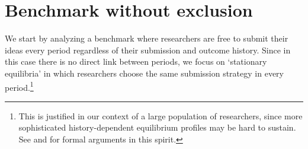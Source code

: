 \documentclass[12pt]{article}
\theoremstyle{plain}
\theoremstyle{definition}
\newtheorem{definition}{Definition}
\theoremstyle{remark}
\begin{document}






\section{Benchmark without exclusion}\label{sec-benchmark}

We start by analyzing a benchmark where researchers are free to submit their ideas every period regardless of their submission and outcome history. Since in this case there is no direct link between periods, we focus on `stationary equilibria' in which researchers choose the same submission strategy in every period.\footnote{This is justified in our context of a large population of researchers, since more sophisticated history-dependent equilibrium profiles may be hard to sustain. See \citet{green1980noncooperative} and \citet{sabourian1990anonymous} for formal arguments in this spirit.} 
\end{document}
